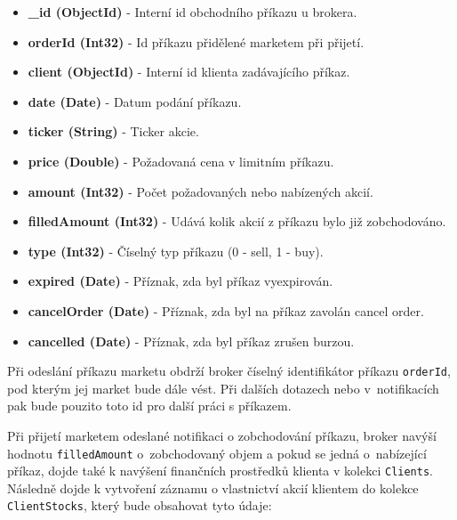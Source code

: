 \documentclass[thesis=M,czech]{FITthesis}[2012/06/26]
\begin{document}
\begin{itemize}

\item \textbf{\_id (ObjectId)} - Interní id obchodního příkazu u brokera.

\item \textbf{orderId (Int32)} - Id příkazu přidělené marketem při přijetí.

\item \textbf{client (ObjectId)} - Interní id klienta zadávajícího příkaz.

\item \textbf{date (Date)} - Datum podání příkazu.

\item \textbf{ticker (String)} - Ticker akcie.

\item \textbf{price (Double)} - Požadovaná cena v limitním příkazu.

\item \textbf{amount (Int32)} - Počet požadovaných nebo nabízených akcií.

\item \textbf{filledAmount (Int32)} - Udává kolik akcií z příkazu bylo již zobchodováno.

\item \textbf{type (Int32)} - Číselný typ příkazu (0 - sell, 1 - buy).

\item \textbf{expired (Date)} - Příznak, zda byl příkaz vyexpirován.

\item \textbf{cancelOrder (Date)} - Příznak, zda byl na příkaz zavolán cancel order.

\item \textbf{cancelled (Date)} - Příznak, zda byl příkaz zrušen burzou.

\end{itemize}

	Při odeslání příkazu marketu obdrží broker číselný identifikátor příkazu \texttt{orderId}, pod kterým jej market bude dále vést. Při dalších dotazech nebo v~notifikacích pak bude pouzito toto id pro další práci s příkazem.
	
	Při přijetí marketem odeslané notifikaci o zobchodování příkazu, broker navýší hodnotu \texttt{filledAmount} o~zobchodovaný objem a pokud se jedná o~nabízející příkaz, dojde také k navýšení finančních prostředků klienta v kolekci \texttt{Clients}. Následně dojde k vytvoření záznamu o vlastnictví akcií klientem do kolekce \texttt{ClientStocks}, který bude obsahovat tyto údaje:
	
\end{document}
